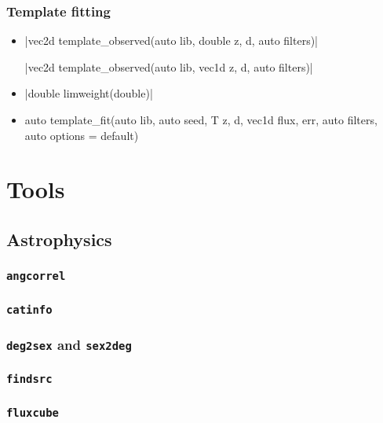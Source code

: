 \documentclass[12pt]{report}
\newcommand*\circled[1]{\tikz[baseline=(char.base)]{
            \node[shape=circle,draw,inner sep=0.0pt] (char) {#1};}}
\newcommand{\vectorfuncsym}{\circled{$\hspace{-1pt}\mathcal{V}$}\xspace}
\newcommand{\vectorfunc}{\vectorfuncsym\hspace{2pt}\xspace}
\begin{document}
\subsection{Template fitting}

\begin{itemize}
\item \cppinline|vec2d template_observed(auto lib, double z, d, auto filters)| 

\cppinline|vec2d template_observed(auto lib, vec1d z, d, auto filters)|

\item \vectorfunc \cppinline|double limweight(double)| 

\item {} \begin{cppcode}
auto template_fit(auto lib, auto seed, T z, d, vec1d flux, err,
                  auto filters, auto options = default)
\end{cppcode}
\end{itemize}

\chapter{Tools \label{SEC:tool}}

\section{Astrophysics \label{SEC:tool:astro}}
\subsection{\texttt{angcorrel}} 
\subsection{\texttt{catinfo}} 
\subsection{\texttt{deg2sex} and \texttt{sex2deg}}  
\subsection{\texttt{findsrc}} 
\subsection{\texttt{fluxcube}} 
\end{document}
